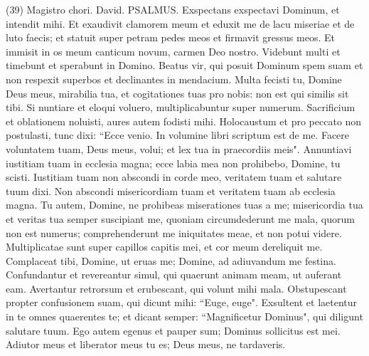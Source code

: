 \begin{biblechapter}  (39) 
\verse  Magistro chori. David. PSALMUS. 
\verse Exspectans exspectavi Dominum, et intendit mihi. 
\verse Et exaudivit clamorem meum et eduxit me de lacu miseriae et de luto faecis; et statuit super petram pedes meos et firmavit gressus meos. 
\verse Et immisit in os meum canticum novum, carmen Deo nostro. Videbunt multi et timebunt et sperabunt in Domino. 
\verse Beatus vir, qui posuit Dominum spem suam et non respexit superbos et declinantes in mendacium. 
\verse Multa fecisti tu, Domine Deus meus, mirabilia tua, et cogitationes tuas pro nobis: non est qui similis sit tibi. Si nuntiare et eloqui voluero, multiplicabuntur super numerum. 
\verse Sacrificium et oblationem noluisti, aures autem fodisti mihi. Holocaustum et pro peccato non postulasti, 
\verse tunc dixi: “Ecce venio. In volumine libri scriptum est de me. 
\verse Facere voluntatem tuam, Deus meus, volui; et lex tua in praecordiis meis". 
\verse Annuntiavi iustitiam tuam in ecclesia magna; ecce labia mea non prohibebo, Domine, tu scisti. 
\verse Iustitiam tuam non abscondi in corde meo, veritatem tuam et salutare tuum dixi. Non abscondi misericordiam tuam et veritatem tuam ab ecclesia magna. 
\verse Tu autem, Domine, ne prohibeas miserationes tuas a me; misericordia tua et veritas tua semper suscipiant me, 
\verse quoniam circumdederunt me mala, quorum non est numerus; comprehenderunt me iniquitates meae, et non potui videre. Multiplicatae sunt super capillos capitis mei, et cor meum dereliquit me. 
\verse Complaceat tibi, Domine, ut eruas me; Domine, ad adiuvandum me festina. 
\verse Confundantur et revereantur simul, qui quaerunt animam meam, ut auferant eam. Avertantur retrorsum et erubescant, qui volunt mihi mala. 
\verse Obstupescant propter confusionem suam, qui dicunt mihi: “Euge, euge". 
\verse Exsultent et laetentur in te omnes quaerentes te; et dicant semper: “Magnificetur Dominus", qui diligunt salutare tuum. 
\verse Ego autem egenus et pauper sum; Dominus sollicitus est mei. Adiutor meus et liberator meus tu es; Deus meus, ne tardaveris. 
\end{biblechapter}

